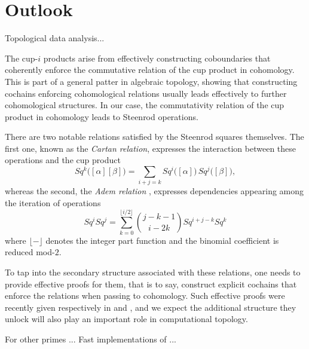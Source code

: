 
\section{Outlook} \label{s:outlook}

Topological data analysis...

The cup-$i$ products arise from effectively constructing coboundaries that coherently enforce the commutative relation of the cup product in cohomology.
This is part of a general patter in algebraic topology, showing that constructing cochains enforcing cohomological relations usually leads effectively to further cohomological structures.
In our case, the commutativity relation of the cup product in cohomology leads to Steenrod operations.

There are two notable relations satisfied by the Steenrod squares themselves.
The first one, known as the \textit{Cartan relation}, expresses the interaction between these operations and the cup product
\begin{equation*}
Sq^k \big( [\alpha] [\beta] \big) = \sum_{i+j=k} Sq^i \big([\alpha]\big)\, Sq^j \big([\beta]\big),
\end{equation*}
whereas the second, the \textit{Adem relation} \cite{adem52relations}, expresses dependencies appearing among the iteration of operations
\begin{equation} \label{equation: adem relations}
Sq^i Sq^j = \sum_{k=0}^{\lfloor i/2 \rfloor} {j-k-1 \choose i-2k} Sq^{i+j-k} Sq^k
\end{equation}
where $\lfloor- \rfloor$ denotes the integer part function and the binomial coefficient is reduced mod-$2$.

To tap into the secondary structure associated with these relations, one needs to provide effective proofs for them, that is to say, construct explicit cochains that enforce the relations when passing to cohomology.
Such effective proofs were recently given respectively in \cite{medina2020cartan} and \cite{medina2020adem}, and we expect the additional structure they unlock will also play an important role in computational topology.

For other primes ... Fast implementations of \cite{medina2020odd} ...